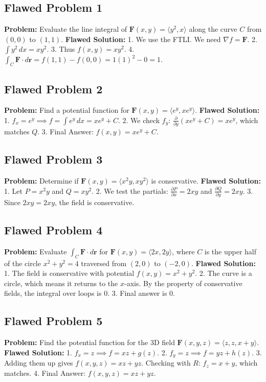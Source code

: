 \documentclass[12pt]{article}
\begin{document}
\subsection{Flawed Problem 1}
\textbf{Problem:} Evaluate the line integral of $\mathbf{F}(x, y) = \langle y^2, x \rangle$ along the curve $C$ from $(0,0)$ to $(1,1)$.
\textbf{Flawed Solution:} 
1. We use the FTLI. We need $\nabla f = \mathbf{F}$.
2. $\int y^2 \, dx = xy^2$.
3. Thus $f(x, y) = xy^2$.
4. $\int_C \mathbf{F} \cdot d\mathbf{r} = f(1,1) - f(0,0) = 1(1)^2 - 0 = 1$.

\subsection{Flawed Problem 2}
\textbf{Problem:} Find a potential function for $\mathbf{F}(x, y) = \langle e^y, xe^y \rangle$.
\textbf{Flawed Solution:}
1. $f_x = e^y \implies f = \int e^y \, dx = xe^y + C$.
2. We check $f_y$: $\frac{\partial}{\partial y}(xe^y + C) = xe^y$, which matches $Q$.
3. Final Answer: $f(x, y) = xe^y + C$.

\subsection{Flawed Problem 3}
\textbf{Problem:} Determine if $\mathbf{F}(x, y) = \langle x^2y, xy^2 \rangle$ is conservative.
\textbf{Flawed Solution:}
1. Let $P = x^2y$ and $Q = xy^2$.
2. We test the partials: $\frac{\partial P}{\partial x} = 2xy$ and $\frac{\partial Q}{\partial y} = 2xy$.
3. Since $2xy = 2xy$, the field is conservative.

\subsection{Flawed Problem 4}
\textbf{Problem:} Evaluate $\int_C \mathbf{F} \cdot d\mathbf{r}$ for $\mathbf{F}(x, y) = \langle 2x, 2y \rangle$, where $C$ is the upper half of the circle $x^2 + y^2 = 4$ traversed from $(2,0)$ to $(-2,0)$.
\textbf{Flawed Solution:}
1. The field is conservative with potential $f(x, y) = x^2 + y^2$.
2. The curve is a circle, which means it returns to the $x$-axis. By the property of conservative fields, the integral over loops is $0$.
3. Final answer is $0$.

\subsection{Flawed Problem 5}
\textbf{Problem:} Find the potential function for the 3D field $\mathbf{F}(x, y, z) = \langle z, z, x + y \rangle$.
\textbf{Flawed Solution:}
1. $f_x = z \implies f = xz + g(z)$.
2. $f_y = z \implies f = yz + h(z)$.
3. Adding them up gives $f(x, y, z) = xz + yz$. Checking with $R$: $f_z = x + y$, which matches.
4. Final Answer: $f(x, y, z) = xz + yz$.
\end{document}
